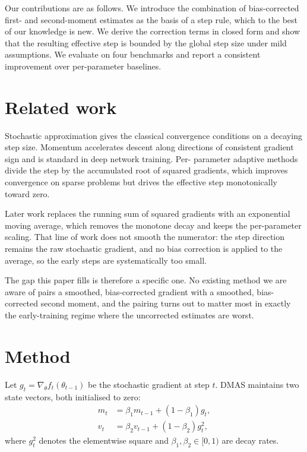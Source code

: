 \documentclass{article}
\begin{document}
Our contributions are as follows. We introduce the combination of
bias-corrected first- and second-moment estimates as the basis of a step
rule, which to the best of our knowledge is new. We derive the correction
terms in closed form and show that the resulting effective step is bounded by
the global step size under mild assumptions. We evaluate on four benchmarks
and report a consistent improvement over per-parameter baselines.

\section{Related work}

Stochastic approximation gives the classical convergence conditions on a
decaying step size. Momentum accelerates descent along directions of
consistent gradient sign and is standard in deep network training. Per-
parameter adaptive methods divide the step by the accumulated root of squared
gradients, which improves convergence on sparse problems but drives the
effective step monotonically toward zero.

Later work replaces the running sum of squared gradients with an exponential
moving average, which removes the monotone decay and keeps the per-parameter
scaling. That line of work does not smooth the numerator: the step direction
remains the raw stochastic gradient, and no bias correction is applied to the
average, so the early steps are systematically too small.

The gap this paper fills is therefore a specific one. No existing method we
are aware of pairs a smoothed, bias-corrected gradient with a smoothed,
bias-corrected second moment, and the pairing turns out to matter most in
exactly the early-training regime where the uncorrected estimates are worst.

\section{Method}

Let $g_t = \nabla_\theta f_t(\theta_{t-1})$ be the stochastic gradient at step
$t$. DMAS maintains two state vectors, both initialised to zero:
\begin{align}
  m_t &= \beta_1 m_{t-1} + (1 - \beta_1) g_t, \\
  v_t &= \beta_2 v_{t-1} + (1 - \beta_2) g_t^2,
\end{align}
where $g_t^2$ denotes the elementwise square and $\beta_1, \beta_2 \in [0,1)$
are decay rates.
\end{document}
